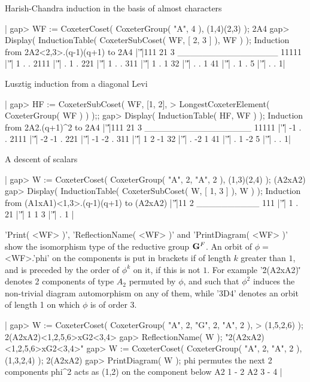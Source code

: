 Harish-Chandra induction in the basis of almost characters\:

|    gap> WF := CoxeterCoset( CoxeterGroup( "A", 4 ), (1,4)(2,3) );
    2A4
    gap> Display( InductionTable( CoxeterSubCoset( WF, [ 2, 3 ] ), WF ) );
    Induction from 2A2<2,3>.(q-1)(q+1) to 2A4
          |'\|'|111 21 3
    ________________
    11111 |'\|'|  1  . .
    2111  |'\|'|  .  1 .
    221   |'\|'|  1  . .
    311   |'\|'|  1  . 1
    32    |'\|'|  .  . 1
    41    |'\|'|  .  1 .
    5     |'\|'|  .  . 1|

Lusztig induction from a diagonal Levi\:

|    gap> HF := CoxeterSubCoset( WF, [1, 2],
    >                LongestCoxeterElement( CoxeterGroup( WF ) ) );;
    gap> Display( InductionTable( HF, WF ) );
    Induction from 2A2.(q+1)^2 to 2A4
          |'\|'|111 21  3
    _________________
    11111 |'\|'| -1  .  .
    2111  |'\|'| -2 -1  .
    221   |'\|'| -1 -2  .
    311   |'\|'|  1  2 -1
    32    |'\|'|  . -2  1
    41    |'\|'|  .  1 -2
    5     |'\|'|  .  .  1|

A descent of scalars\:

|    gap> W := CoxeterCoset( CoxeterGroup( "A", 2, "A", 2 ), (1,3)(2,4) );
    (A2xA2)
    gap> Display( InductionTable( CoxeterSubCoset( W, [ 1, 3 ] ), W ) );
    Induction from (A1xA1)<1,3>.(q-1)(q+1) to (A2xA2)
        |'\|'|11 2
    __________
    111 |'\|'| 1 .
    21  |'\|'| 1 1
    3   |'\|'| . 1 |

'Print(  <WF> )', 'ReflectionName( <WF> )'  and 'PrintDiagram( <WF> )' show
the   isomorphism  type  of  the  reductive  group  ${\bf G}^F$.  An  orbit  of
$\phi=$<WF>.'phi'  on the  components is  put in  brackets if of length $k$
greater  than $1$, and is preceded by the  order of $\phi^k$ on it, if this
is  not $1$. For example '\"2(A2xA2)\"'  denotes 2 components of type $A_2$
permuted  by $\phi$, and such that $\phi^2$ induces the non-trivial diagram
automorphism  on any of them,  while '3D4' denotes an  orbit of length 1 on
which $\phi$ is of order 3.

|    gap> W := CoxeterCoset( CoxeterGroup( "A", 2, "G", 2, "A", 2 ),
    >                                                       (1,5,2,6) );
    2(A2xA2)<1,2,5,6>xG2<3,4>
    gap> ReflectionName( W );
    "2(A2xA2)<1,2,5,6>xG2<3,4>"
    gap> W := CoxeterCoset( CoxeterGroup( "A", 2, "A", 2 ), (1,3,2,4) );
    2(A2xA2)
    gap> PrintDiagram( W );
    phi permutes the next 2 components
    phi^2 acts as (1,2) on the component below
    A2    1 - 2
    A2    3 - 4 |

